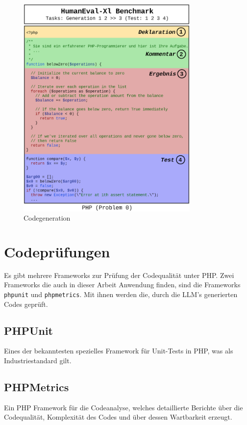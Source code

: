 \begin{figure}[!ht]
	\includegraphics[width=0.8\textwidth]{content/chapter_intruduction/images/code_generation_humaneval_x.eps}
	\centering
	\caption{Codegeneration}
	\label{img:code_generation_humaneval}
\end{figure}



\section{Codeprüfungen}
Es gibt mehrere Frameworks zur Prüfung der Codequalität unter PHP. Zwei Frameworks die auch in dieser Arbeit Anwendung finden, sind die Frameworks \texttt{phpunit} und \texttt{phpmetrics}. Mit ihnen werden die, durch die LLM's generierten Codes geprüft.

\subsection{PHPUnit}
Eines der bekanntesten spezielles Framework für Unit-Tests in PHP, was als Industriestandard gilt.

\subsection{PHPMetrics}
Ein PHP Framework für die Codeanalyse, welches detaillierte Berichte über die Codequalität, Komplexität des Codes und über dessen Wartbarkeit erzeugt.

